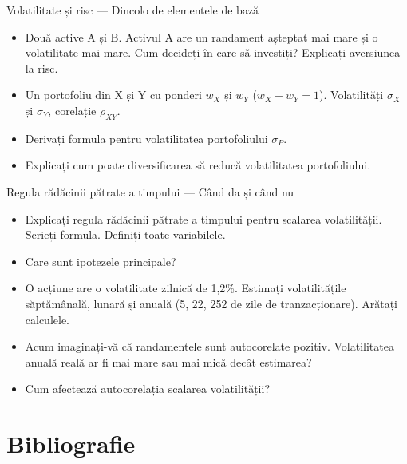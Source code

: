 \documentclass[9pt, aspectratio=169, t]{beamer}
\theoremstyle{definition}
\begin{document}
\begin{frame}{Volatilitate și risc --- Dincolo de elementele de bază}
\begin{itemize}
    \item Două active A și B. Activul A are un randament așteptat mai mare și o volatilitate mai mare. Cum decideți în care să investiți? Explicați aversiunea la risc.
    \item Un portofoliu din X și Y cu ponderi $w_X$ și $w_Y$ ($w_X + w_Y = 1$). Volatilități $\sigma_X$ și $\sigma_Y$, corelație $\rho_{XY}$.
    \item Derivați formula pentru volatilitatea portofoliului $\sigma_P$.
    \item Explicați cum poate diversificarea să reducă volatilitatea portofoliului.
\end{itemize}
\end{frame}

\begin{frame}{Regula rădăcinii pătrate a timpului --- Când da și când nu}
\begin{itemize}
    \item Explicați regula rădăcinii pătrate a timpului pentru scalarea volatilității. Scrieți formula. Definiți toate variabilele.
    \item Care sunt ipotezele principale?
    \item O acțiune are o volatilitate zilnică de 1,2\%. Estimați volatilitățile săptămânală, lunară și anuală (5, 22, 252 de zile de tranzacționare). Arătați calculele.
    \item Acum imaginați-vă că randamentele sunt autocorelate pozitiv. Volatilitatea anuală reală ar fi mai mare sau mai mică decât estimarea?
    \item Cum afectează autocorelația scalarea volatilității?
\end{itemize}
\end{frame}

\section{Bibliografie}
\end{document}
